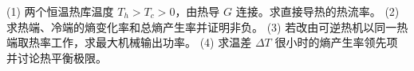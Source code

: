 (1) 两个恒温热库温度 \(T_h>T_c>0\)，由热导 \(G\) 连接。求直接导热的热流率。
(2) 求热端、冷端的熵变化率和总熵产生率并证明非负。
(3) 若改由可逆热机以同一热端取热率工作，求最大机械输出功率。
(4) 求温差 \(\Delta T\) 很小时的熵产生率领先项并讨论热平衡极限。
